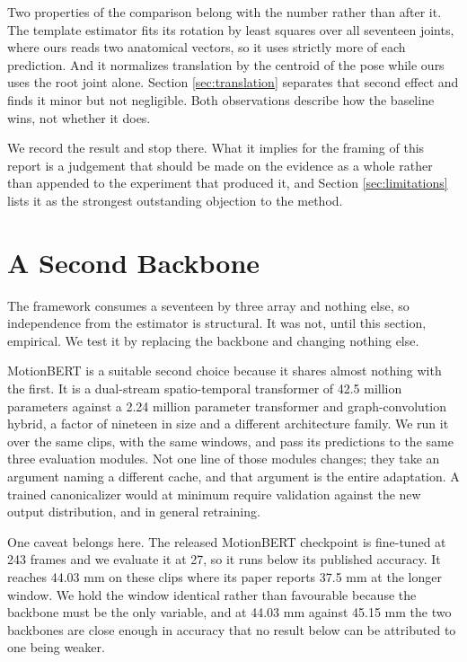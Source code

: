 \documentclass[12pt,a4paper]{report}
\begin{document}
Two properties of the comparison belong with the number rather than after it. The template estimator fits its rotation by least squares over all seventeen joints, where ours reads two anatomical vectors, so it uses strictly more of each prediction. And it normalizes translation by the centroid of the pose while ours uses the root joint alone. Section \ref{sec:translation} separates that second effect and finds it minor but not negligible. Both observations describe how the baseline wins, not whether it does.

We record the result and stop there. What it implies for the framing of this report is a judgement that should be made on the evidence as a whole rather than appended to the experiment that produced it, and Section \ref{sec:limitations} lists it as the strongest outstanding objection to the method.

\section{A Second Backbone}
\label{sec:backbone}
\label{sec:backbone2}

The framework consumes a seventeen by three array and nothing else, so independence from the estimator is structural. It was not, until this section, empirical. We test it by replacing the backbone and changing nothing else.

MotionBERT is a suitable second choice because it shares almost nothing with the first. It is a dual-stream spatio-temporal transformer of 42.5 million parameters against a 2.24 million parameter transformer and graph-convolution hybrid, a factor of nineteen in size and a different architecture family. We run it over the same clips, with the same windows, and pass its predictions to the same three evaluation modules. Not one line of those modules changes; they take an argument naming a different cache, and that argument is the entire adaptation. A trained canonicalizer would at minimum require validation against the new output distribution, and in general retraining.

One caveat belongs here. The released MotionBERT checkpoint is fine-tuned at 243 frames and we evaluate it at 27, so it runs below its published accuracy. It reaches 44.03 mm on these clips where its paper reports 37.5 mm at the longer window. We hold the window identical rather than favourable because the backbone must be the only variable, and at 44.03 mm against 45.15 mm the two backbones are close enough in accuracy that no result below can be attributed to one being weaker.
\end{document}
